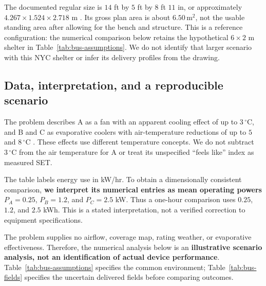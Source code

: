 \documentclass[12pt]{article}
\begin{document}
The documented regular size is $14$ ft by $5$ ft by $8$ ft $11$ in, or approximately $4.267\times1.524\times2.718$ m \cite{nycshelter}. Its gross plan area is about $6.50\,\mathrm{m^2}$, not the usable standing area after allowing for the bench and structure. This is a reference configuration: the numerical comparison below retains the hypothetical $6\times2$ m shelter in Table~\ref{tab:bus-assumptions}. We do not identify that larger scenario with this NYC shelter or infer its delivery profiles from the drawing.

\subsection{Data, interpretation, and a reproducible scenario}

The problem describes A as a fan with an apparent cooling effect of up to $3\,^{\circ}\mathrm C$, and B and C as evaporative coolers with air-temperature reductions of up to $5$ and $8\,^{\circ}\mathrm C$ \cite{problem}. These effects use different temperature concepts. We do not subtract $3\,^{\circ}\mathrm C$ from the air temperature for A or treat its unspecified ``feels like'' index as measured SET.

The table labels energy use in kW/hr. To obtain a dimensionally consistent comparison, \textbf{we interpret its numerical entries as mean operating powers} $P_A=0.25$, $P_B=1.2$, and $P_C=2.5$ kW. Thus a one-hour comparison uses $0.25$, $1.2$, and $2.5$ kWh. This is a stated interpretation, not a verified correction to equipment specifications.

The problem supplies no airflow, coverage map, rating weather, or evaporative effectiveness. Therefore, the numerical analysis below is an \textbf{illustrative scenario analysis, not an identification of actual device performance}. Table~\ref{tab:bus-assumptions} specifies the common environment; Table~\ref{tab:bus-fields} specifies the uncertain delivered fields before comparing outcomes.
\end{document}
